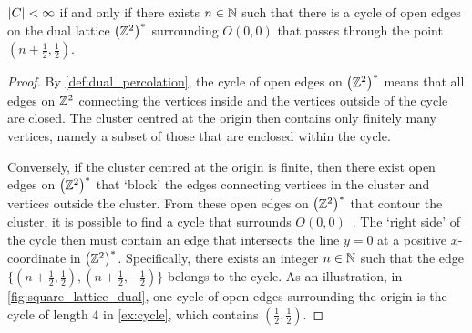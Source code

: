 \documentclass[a4paper, 12pt]{article}
\begin{document}
\begin{prop}\label{prop:cycle_finite}
    $\lvert C \rvert < \infty$ if and only if there exists $n \in \mathbb{N}$ such that there is a cycle of open edges on the dual lattice $\left(\mathbb{Z}^2\right)^*$ surrounding $O(0, 0)$ that passes through the point $(n + \frac{1}{2}, \frac{1}{2})$.
\end{prop}
\begin{proof}
    By \cref{def:dual_percolation}, the cycle of open edges on $\left(\mathbb{Z}^2\right)^*$ means that all edges on $\mathbb{Z}^2$ connecting the vertices inside and the vertices outside of the cycle are closed. The cluster centred at the origin then contains only finitely many vertices, namely a subset of those that are enclosed within the cycle.
    
    Conversely, if the cluster centred at the origin is finite, then there exist open edges on $\left(\mathbb{Z}^2\right)^*$ that `block' the edges connecting vertices in the cluster and vertices outside the cluster. From these open edges on $\left(\mathbb{Z}^2\right)^*$ that contour the cluster, it is possible to find a cycle that surrounds $O(0, 0)$~\autocite[14--15]{grimmett_1999}. The `right side' of the cycle then must contain an edge that intersects the line $y = 0$ at a positive $x$-coordinate in $\left(\mathbb{Z}^2\right)^*$. Specifically, there exists an integer $n \in \mathbb{N}$ such that the edge $\{(n + \frac{1}{2}, \frac{1}{2}), (n + \frac{1}{2}, -\frac{1}{2})\}$ belongs to the cycle. As an illustration, in \cref{fig:square_lattice_dual}, one cycle of open edges surrounding the origin is the cycle of length $4$ in \cref{ex:cycle}, which contains $(\frac{1}{2}, \frac{1}{2})$.
\end{proof}
\end{document}

